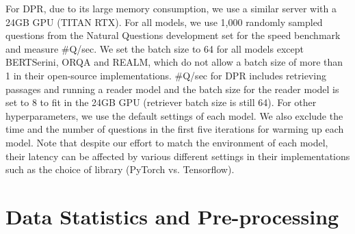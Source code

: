 \documentclass[11pt,a4paper]{article}
\begin{document}
\begin{table}[h]
    \centering
    \caption{Server specification for the benchmark
    }
    \label{tab:server}
\end{table}
 For DPR, due to its large memory consumption, we use a similar server with a 24GB GPU (TITAN RTX).
For all models, we use 1,000 randomly sampled questions from the Natural Questions development set for the speed benchmark and measure \#Q/sec.
We set the batch size to 64 for all models except BERTSerini, ORQA and REALM, which do not allow a batch size of more than 1 in their open-source implementations.
\#Q/sec for DPR includes retrieving passages and running a reader model and the batch size for the reader model is set to 8 to fit in the 24GB GPU (retriever batch size is still 64).
For other hyperparameters, we use the default settings of each model.
We also exclude the time and the number of questions in the first five iterations for warming up each model.
Note that despite our effort to match the environment of each model, their latency can be affected by various different settings in their implementations such as the choice of library (PyTorch vs. Tensorflow).



\section{Data Statistics and Pre-processing}\label{apdx:prepro}
\end{document}
